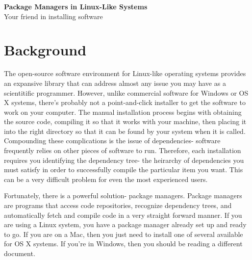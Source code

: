 \documentclass[12pt, letterpaper]{article}
\begin{document}
\begin{center}
  {\LARGE \textbf{Package Managers in Linux-Like Systems}}\\
  {\large Your friend in installing software}\\
\end{center}

\section{Background}
The open-source software environment for Linux-like operating systems provides
an expansive library that can address almost any issue you may have as a
scientitific programmer.  However, unlike commercial software for Windows or
OS X systems, there's probably not a point-and-click installer to get the
software to work on your computer.  The manual installation process begins with
obtaining the source code, compiling it so that it works with your machine,
then placing it into the right directory so that it can be found by your
system when it is called.  Compounding these complications is the issue of
dependencies- software frequently relies on other pieces of software to run.
Therefore, each installation requires you identifying the dependency tree-
the heirarchy of dependencies you must satisfy in order to successfully
compile the particular item you want.  This can be a very difficult problem
for even the most experienced users.

Fortunately, there is a powerful solution- package managers.  Package managers
are programs that access code repositories, recognize dependency trees, and
automatically fetch and compile code in a very straight forward manner.  If
you are using a Linux system, you have a package manager already set up and
ready to go.  If you are on a Mac, then you just need to install one of
several available for OS X systems.  If you're in Windows, then you should be
reading a different document.
\end{document}
